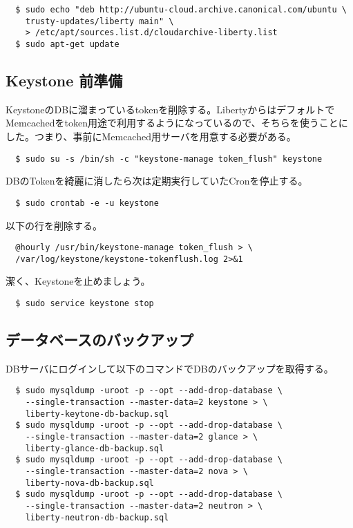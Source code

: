 \documentclass[9pt,b5paper,tombo,openany]{jsbook}
\begin{document}
\begin{lstlisting}
  $ sudo echo "deb http://ubuntu-cloud.archive.canonical.com/ubuntu \
    trusty-updates/liberty main" \
    > /etc/apt/sources.list.d/cloudarchive-liberty.list
  $ sudo apt-get update
\end{lstlisting}

\subsection{Keystone 前準備}
KeystoneのDBに溜まっているtokenを削除する。LibertyからはデフォルトでMemcachedをtoken用途で利用するようになっているので、そちらを使うことにした。つまり、事前にMemcached用サーバを用意する必要がある。

\begin{lstlisting}
  $ sudo su -s /bin/sh -c "keystone-manage token_flush" keystone
\end{lstlisting}

\noindent
DBのTokenを綺麗に消したら次は定期実行していたCronを停止する。

\begin{lstlisting}
  $ sudo crontab -e -u keystone
\end{lstlisting}

\noindent
以下の行を削除する。

\begin{lstlisting}
  @hourly /usr/bin/keystone-manage token_flush > \
  /var/log/keystone/keystone-tokenflush.log 2>&1
\end{lstlisting}

\noindent
潔く、Keystoneを止めましょう。

\begin{lstlisting}
  $ sudo service keystone stop
\end{lstlisting}

\subsection{データベースのバックアップ}
\noindent
DBサーバにログインして以下のコマンドでDBのバックアップを取得する。

\begin{lstlisting}
  $ sudo mysqldump -uroot -p --opt --add-drop-database \
    --single-transaction --master-data=2 keystone > \
    liberty-keytone-db-backup.sql
  $ sudo mysqldump -uroot -p --opt --add-drop-database \
    --single-transaction --master-data=2 glance > \
    liberty-glance-db-backup.sql
  $ sudo mysqldump -uroot -p --opt --add-drop-database \
    --single-transaction --master-data=2 nova > \
    liberty-nova-db-backup.sql
  $ sudo mysqldump -uroot -p --opt --add-drop-database \
    --single-transaction --master-data=2 neutron > \
    liberty-neutron-db-backup.sql
\end{lstlisting}
\end{document}
